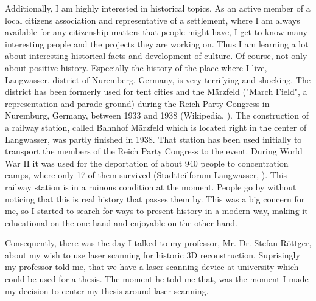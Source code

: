 Additionally, I am highly interested in historical topics. As an active member of a local citizens association and representative of a settlement, where I am always available for any citizenship matters that people might have, I get to know many interesting people and the projects they are working on. Thus I am learning a lot about interesting historical facts and development of culture. Of course, not only about positive history. Especially the history of the place where I live, Langwasser, district of Nuremberg, Germany, is very terrifying and shocking. The district has been formerly used for tent cities and the Märzfeld ("March Field", a representation and parade ground) during the Reich Party Congress in Nuremburg, Germany, between 1933 and 1938 (Wikipedia, \parencite{wiki:NaziPartyRallyGround}). The construction of a railway station, called Bahnhof Märzfeld which is located right in the center of Langwasser, was partly finished in 1938. That station has been used initially to transport the members of the Reich Party Congress to the event. During World War II it was used for the deportation of about 940 people to concentration camps, where only 17 of them survived (Stadtteilforum Langwasser, \parencite{StadtteilforumTafel6}). This railway station is in a ruinous condition at the moment. People go by without noticing that this is real history that passes them by. This was a big concern for me, so I started to search for ways to present history in a modern way, making it educational on the one hand and enjoyable on the other hand.

Consequently, there was the day I talked to my professor, Mr. Dr. Stefan Röttger, about my wish to use laser scanning for historic 3D reconstruction. Suprisingly my professor told me, that we have a laser scanning device at university which could be used for a thesis. The moment he told me that, was the moment I made my decision to center my thesis around laser scanning.

